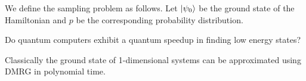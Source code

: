 \documentclass[twocolumn]{revtex4-2}
\begin{document}
We define the sampling problem as follows. Let $\ket{\psi_0}$ be the ground
state of the Hamiltonian and $p$ be the corresponding probability distribution.

Do quantum computers exhibit a quantum speedup in finding low
energy states?

Classically the ground state of 1-dimensional systems can be approximated using
DMRG in polynomial time.
\end{document}
